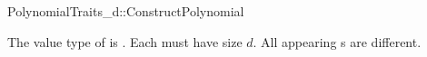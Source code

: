 \begin{ccRefConcept}{PolynomialTraits_d::ConstructPolynomial}
{        \ccPrecond The value type of  is
        .    
        \ccPrecond Each  must have size $d$.
        \ccPrecond All appearing s are different.  
       
        }


\ccSeeAlso

\\

\end{ccRefConcept}
